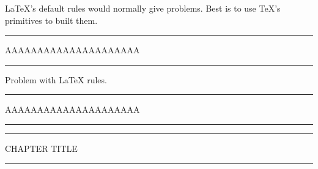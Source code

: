 
LaTeX's default rules would normally give problems. Best is to use TeX's primitives to built them.


\begin{texexample}{}{}
\makeatletter
\hrule width 5cm \p@
AAAAAAAAAAAAAAAAAAAAA
\vskip2.6pt\hrule width 5cm
\medskip

Problem with LaTeX rules.

\rule{5cm}{0.4pt}\par
AAAAAAAAAAAAAAAAAAAAA\par%
\rule[6.5pt]{5cm}{0.4pt}

\def\rule{\@ifnextchar[\@rule{\@rule[\z@]}}
\def\@rule[#1]#2#3{%
 \leavevmode
 \hbox{%
 \setlength\@tempdima{#1}%
 \setlength\@tempdimb{#2}%
 \setlength\@tempdimc{#3}%
 \advance\@tempdimc\@tempdima%
 \vrule\@width\@tempdimb\@height\@tempdimc\@depth-\@tempdima}}

\def\thickrule{\leavevmode \leaders \hrule height 3pt \hfill \kern \z@}

{\color{teal}\hrule width 10.5cm height3pt \p@
    {{\color{black!80}\HUGE CHAPTER TITLE}}\vskip3pt
\hrule width 10.5cm height3pt}
\makeatother
\end{texexample}
